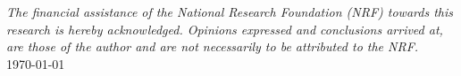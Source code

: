 \documentclass[
11pt, %
english, %
onehalfspacing, %
headsepline, %
]{MastersDoctoralThesis} %
\theoremstyle{customdefstyle}
\begin{document}
\begin{titlepage}
\begin{center}
\large \textit{The financial assistance of the National Research Foundation (NRF) towards this research is hereby acknowledged. Opinions expressed and conclusions arrived at, are those of the author and are not necessarily to be attributed to the NRF.}\\[0.2cm]
{\large \monthyeardate\today}\\[4cm] %
 
\vfill
\end{center}
\end{titlepage}

\let\cleardoublepage\clearpage

\end{document}
